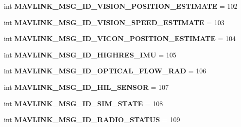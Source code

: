 \begin{DoxyCompactItemize}
int {\bfseries M\+A\+V\+L\+I\+N\+K\+\_\+\+M\+S\+G\+\_\+\+I\+D\+\_\+\+V\+I\+S\+I\+O\+N\+\_\+\+P\+O\+S\+I\+T\+I\+O\+N\+\_\+\+E\+S\+T\+I\+M\+A\+TE} = 102
\item 
\mbox{\label{namespacepymavlink_1_1dialects_1_1v10_aeda516686dda7fdb9343f5aa4c58ccda}} 
int {\bfseries M\+A\+V\+L\+I\+N\+K\+\_\+\+M\+S\+G\+\_\+\+I\+D\+\_\+\+V\+I\+S\+I\+O\+N\+\_\+\+S\+P\+E\+E\+D\+\_\+\+E\+S\+T\+I\+M\+A\+TE} = 103
\item 
\mbox{\label{namespacepymavlink_1_1dialects_1_1v10_abf266727931f6cabb1bb8412b38b2204}} 
int {\bfseries M\+A\+V\+L\+I\+N\+K\+\_\+\+M\+S\+G\+\_\+\+I\+D\+\_\+\+V\+I\+C\+O\+N\+\_\+\+P\+O\+S\+I\+T\+I\+O\+N\+\_\+\+E\+S\+T\+I\+M\+A\+TE} = 104
\item 
\mbox{\label{namespacepymavlink_1_1dialects_1_1v10_a3dc24b20ba0ff6dddd96a7fa73bbece8}} 
int {\bfseries M\+A\+V\+L\+I\+N\+K\+\_\+\+M\+S\+G\+\_\+\+I\+D\+\_\+\+H\+I\+G\+H\+R\+E\+S\+\_\+\+I\+MU} = 105
\item 
\mbox{\label{namespacepymavlink_1_1dialects_1_1v10_ae15c71c965f64630ed899dac6a882fbb}} 
int {\bfseries M\+A\+V\+L\+I\+N\+K\+\_\+\+M\+S\+G\+\_\+\+I\+D\+\_\+\+O\+P\+T\+I\+C\+A\+L\+\_\+\+F\+L\+O\+W\+\_\+\+R\+AD} = 106
\item 
\mbox{\label{namespacepymavlink_1_1dialects_1_1v10_aed082418bc721def9424de5b1fa311be}} 
int {\bfseries M\+A\+V\+L\+I\+N\+K\+\_\+\+M\+S\+G\+\_\+\+I\+D\+\_\+\+H\+I\+L\+\_\+\+S\+E\+N\+S\+OR} = 107
\item 
\mbox{\label{namespacepymavlink_1_1dialects_1_1v10_afd9e4606e49fc44cce1af70fafe030e2}} 
int {\bfseries M\+A\+V\+L\+I\+N\+K\+\_\+\+M\+S\+G\+\_\+\+I\+D\+\_\+\+S\+I\+M\+\_\+\+S\+T\+A\+TE} = 108
\item 
\mbox{\label{namespacepymavlink_1_1dialects_1_1v10_a8354fce1676510527eed6d96a20c337b}} 
int {\bfseries M\+A\+V\+L\+I\+N\+K\+\_\+\+M\+S\+G\+\_\+\+I\+D\+\_\+\+R\+A\+D\+I\+O\+\_\+\+S\+T\+A\+T\+US} = 109
\item 
\mbox{\label{namespacepymavlink_1_1dialects_1_1v10_adeda8613dc161f64fa2f7d160e22195d}} 

\end{DoxyCompactItemize}
